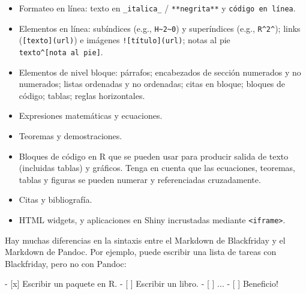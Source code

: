 \documentclass[12pt,]{krantz}
\makeatletter
\newenvironment{Shaded}{\begin{snugshade}}{\end{snugshade}}
\newcommand{\FloatTok}[1]{\textcolor[rgb]{0.00,0.00,0.81}{#1}}
\newcommand{\NormalTok}[1]{#1}
\newenvironment{kframe}{%
\medskip{}
\setlength{\fboxsep}{.8em}
 \def\at@end@of@kframe{}%
 \ifinner\ifhmode%
  \def\at@end@of@kframe{\end{minipage}}%
  \begin{minipage}{\columnwidth}%
 \fi\fi%
 \def\FrameCommand##1{\hskip\@totalleftmargin \hskip-\fboxsep
 \colorbox{shadecolor}{##1}\hskip-\fboxsep
     \hskip-\linewidth \hskip-\@totalleftmargin \hskip\columnwidth}%
 \MakeFramed {\advance\hsize-\width
   \@totalleftmargin\z@ \linewidth\hsize
   \@setminipage}}%
 {\par\unskip\endMakeFramed%
 \at@end@of@kframe}
\renewenvironment{Shaded}{\begin{kframe}}{\end{kframe}}
\theoremstyle{definition}
\theoremstyle{definition}
\theoremstyle{definition}
\theoremstyle{remark}
\makeatother
\begin{document}
\begin{enumerate}
  \begin{itemize}
  \item
    Formateo en línea: texto en \texttt{\_italica\_} /
    \texttt{**negrita**} y
    \texttt{\textasciigrave{}código\ en\ línea\textasciigrave{}}.
  \item
    Elementos en línea: subíndices (e.g.,
    \texttt{H\textasciitilde{}2\textasciitilde{}0}) y superíndices
    (e.g., \texttt{R\^{}2\^{}}); links (\texttt{{[}texto{]}(url)}) e
    imágenes \texttt{!{[}título{]}(url)}; notas al pie
    \texttt{texto\^{}{[}nota\ al\ pie{]}}.
  \item
    Elementos de nivel bloque: párrafos; encabezados de sección
    numerados y no numerados; listas ordenadas y no ordenadas; citas en
    bloque; bloques de código; tablas; reglas horizontales.
  \item
    Expresiones matemáticas y ecuaciones.
  \item
    Teoremas y demostraciones.
  \item
    Bloques de código en R que se pueden usar para producir salida de
    texto (incluidas tablas) y gráficos. Tenga en cuenta que las
    ecuaciones, teoremas, tablas y figuras se pueden numerar y
    referenciadas cruzadamente.
  \item
    Citas y bibliografía.
  \item
    HTML widgets, y aplicaciones en Shiny incrustadas mediante
    \texttt{\textless{}iframe\textgreater{}}.
  \end{itemize}
\end{enumerate}

Hay muchas diferencias en la sintaxis entre el Markdown de Blackfriday y
el Markdown de Pandoc. Por ejemplo, puede escribir una lista de tareas
con Blackfriday, pero no con Pandoc:

\begin{Shaded}
\begin{Highlighting}[]
\NormalTok{- }\FloatTok{[x] Escribir un paquete en R.}
\FloatTok{- [ ] Escribir un libro.}
\FloatTok{- [ ] ...}
\FloatTok{- [ ] Beneficio!}
\end{Highlighting}
\end{Shaded}
\end{document}
